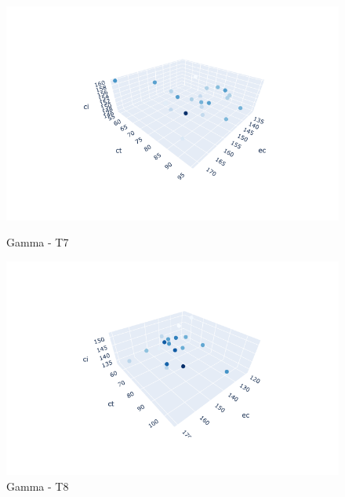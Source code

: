 \documentclass{hust}
\begin{document}
\begin{itemize}
	\begin{figure}[H]
		\begin{minipage}{0.5\textwidth}
			\centering
			\includegraphics[width=1.2\linewidth]{images/ga-dem7.png}
			\caption{Gamma - T7}\label{fig:nsga-ii-ga-dem7}
		\end{minipage}\hfill
		\begin{minipage}{0.5\textwidth}
			\centering
			\includegraphics[width=1.2\linewidth]{images/ga-dem8.png}
			\caption{Gamma - T8}\label{fig:nsga-ii-ga-dem8}
		\end{minipage}
	\end{figure}


\end{itemize}
\end{document}
